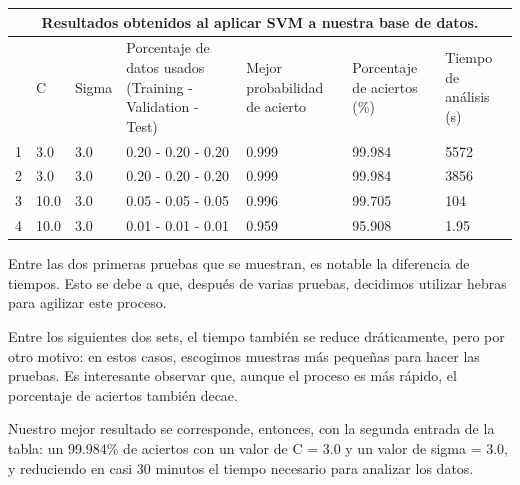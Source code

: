 \documentclass[11pt]{article}
\begin{document}
{

\centering
\begin{tabular}{ |p{0.25cm}||p{0.75cm}|p{0.75cm}|p{3cm}|p{3cm}| p{3cm}|p{3cm}|  }
 \hline
 \multicolumn{7}{|c|}{Resultados obtenidos al aplicar SVM a nuestra base de datos.} \\
 \hline
    & C & Sigma & Porcentaje de datos usados (Training - Validation - Test) & Mejor probabilidad de acierto & Porcentaje de aciertos (\%) & Tiempo de análisis (s)\\
 \hline
 1 & 3.0 & 3.0 & 0.20 - 0.20 - 0.20 & 0.999 & 99.984 & 5572 \\
 2 & 3.0 & 3.0 & 0.20 - 0.20 - 0.20 & 0.999 & 99.984 & 3856 \\
 3 & 10.0 & 3.0 & 0.05 - 0.05 - 0.05 & 0.996 & 99.705 & 104 \\
 4 & 10.0 & 3.0 & 0.01 - 0.01 - 0.01 & 0.959 & 95.908 & 1.95 \\
 \hline
\end{tabular}
}

Entre las dos primeras pruebas que se muestran, es notable la diferencia de tiempos. Esto se debe a que, después de varias pruebas, decidimos utilizar hebras para agilizar este proceso. 

Entre los siguientes dos sets, el tiempo también se reduce dráticamente, pero por otro motivo: en estos casos, escogimos muestras más pequeñas para hacer las pruebas. Es interesante observar que, aunque el proceso es más rápido, el porcentaje de aciertos también decae.

Nuestro mejor resultado se corresponde, entonces, con la segunda entrada de la tabla: un 99.984\% de aciertos con un valor de C = 3.0 y un valor de sigma = 3.0, y reduciendo en casi 30 minutos el tiempo necesario para analizar los datos.
\end{document}
